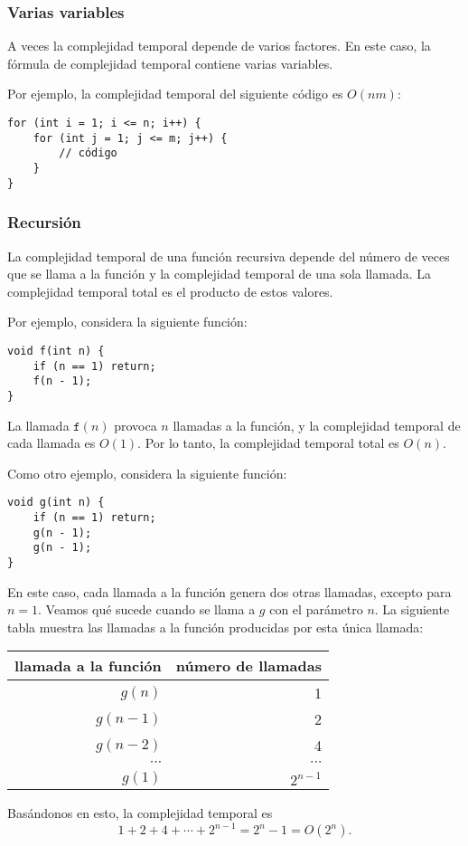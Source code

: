 \subsubsection*{Varias variables}

A veces la complejidad temporal depende de
varios factores.
En este caso, la fórmula de complejidad temporal
contiene varias variables.

Por ejemplo, la complejidad temporal del
siguiente código es $O(nm)$:

\begin{lstlisting}
for (int i = 1; i <= n; i++) {
    for (int j = 1; j <= m; j++) {
        // código
    }
}
\end{lstlisting}

\subsubsection*{Recursión}

La complejidad temporal de una función recursiva
depende del número de veces que se llama a la función
y la complejidad temporal de una sola llamada.
La complejidad temporal total es el producto de
estos valores.

Por ejemplo, considera la siguiente función:
\begin{lstlisting}
void f(int n) {
    if (n == 1) return;
    f(n - 1);
}
\end{lstlisting}
La llamada $\texttt{f}(n)$ provoca $n$ llamadas a la función,
y la complejidad temporal de cada llamada es $O(1)$.
Por lo tanto, la complejidad temporal total es $O(n)$.

Como otro ejemplo, considera la siguiente función:
\begin{lstlisting}
void g(int n) {
    if (n == 1) return;
    g(n - 1);
    g(n - 1);
}
\end{lstlisting}
En este caso, cada llamada a la función genera dos otras
llamadas, excepto para $n=1$.
Veamos qué sucede cuando se llama a $g$
con el parámetro $n$.
La siguiente tabla muestra las llamadas a la función
producidas por esta única llamada:
\begin{center}
    \begin{tabular}{rr}
        llamada a la función & número de llamadas \\
        \hline
        $g(n)$               & 1                  \\
        $g(n-1)$             & 2                  \\
        $g(n-2)$             & 4                  \\
        $\cdots$             & $\cdots$           \\
        $g(1)$               & $2^{n-1}$          \\
    \end{tabular}
\end{center}
Basándonos en esto, la complejidad temporal es
\[1+2+4+\cdots+2^{n-1} = 2^n-1 = O(2^n).\]

